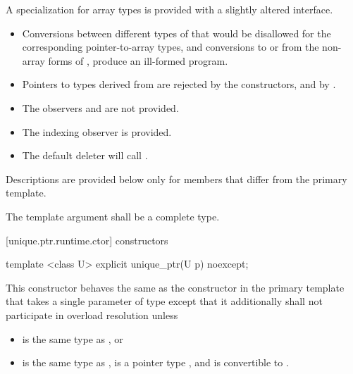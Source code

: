 \pnum
A specialization for array types is provided with a slightly altered
interface.

\begin{itemize}
\item Conversions between different types of
that would be disallowed for the corresponding pointer-to-array types,
and conversions to or from the non-array forms of
, produce an ill-formed program.

\item Pointers to types derived from  are
rejected by the constructors, and by .

\item The observers  and
 are not provided.

\item The indexing observer  is provided.

\item The default deleter will call .
\end{itemize}

\pnum
Descriptions are provided below only for members that
differ from the primary template.

\pnum
The template argument  shall be a complete type.

[unique.ptr.runtime.ctor]{ constructors}

%
\begin{itemdecl}
template <class U> explicit unique_ptr(U p) noexcept;
\end{itemdecl}

\begin{itemdescr}
\pnum
This constructor behaves the same as
the constructor in the primary template that
takes a single parameter of type 
except that it additionally
shall not participate in overload resolution unless

\begin{itemize}
\item {} is the same type as , or
\item {} is the same type as ,
 is a pointer type , and
 is convertible to .
\end{itemize}
\end{itemdescr}

